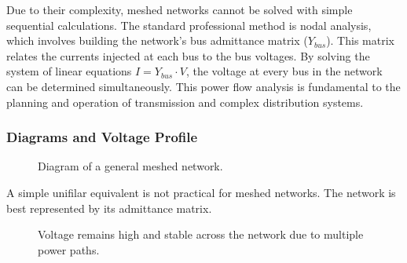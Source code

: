 \documentclass[12pt, a4paper]{article}
\begin{document}
Due to their complexity, meshed networks cannot be solved with simple sequential calculations. The standard professional method is nodal analysis, which involves building the network's bus admittance matrix ($Y_{bus}$). This matrix relates the currents injected at each bus to the bus voltages. By solving the system of linear equations $I = Y_{bus} \cdot V$, the voltage at every bus in the network can be determined simultaneously. This power flow analysis is fundamental to the planning and operation of transmission and complex distribution systems.

\subsubsection{Diagrams and Voltage Profile}
\begin{figure}[htbp]
    \centering
    \caption{Diagram of a general meshed network.}
    \label{fig:meshed_diagram}
\end{figure}

A simple unifilar equivalent is not practical for meshed networks. The network is best represented by its admittance matrix.

\begin{figure}[htbp]
    \centering
    \caption{Voltage remains high and stable across the network due to multiple power paths.}
    \label{fig:meshed_profile}
\end{figure}
\end{document}
